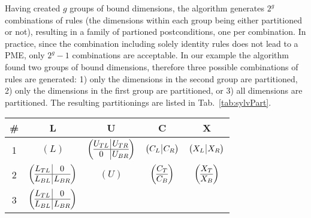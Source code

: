 \documentclass{llncs}
\begin{document}
Having created $g$ groups of bound dimensions, 
the algorithm generates $2^g$ combinations of rules
(the dimensions within each group being either partitioned or not), 
resulting in a family of partioned postconditions, one per combination.
In practice, since the combination including solely identity rules
does not lead to a PME, only $2^g-1$ combinations are acceptable.
In our example the algorithm found two groups of bound dimensions, 
therefore three possible combinations of rules are generated:
1) only the dimensions in the second group are partitioned, 
2) only the dimensions in the first group are partitioned, or
3) all dimensions are partitioned.
The resulting partitionings are listed in Tab.~\ref{tab:sylvPart}.

\begin{table}
\centering
\scriptsize
\renewcommand{\arraystretch}{1.4}
\begin{tabular}{c | c | c | c | c} \toprule
{\bf \#} & {\bf L}  & {\bf U} & {\bf C} & {\bf X} \\\midrule
\rowcolor[gray]{.9}
\scriptsize 1 \rule[-0.35cm]{0cm}{0.9cm} &
$(L)$ & 
$\left( \begin{array}{@{}c@{\,}|@{\,}c@{}} U_{TL} & U_{TR} \\\hline 0 & U_{BR} \end{array} \right)$ &
$\left( \begin{array}{@{}c@{\,}|@{\,}c@{}} C_{L} & C_{R} \end{array} \right)$ &
$\left( \begin{array}{@{}c@{\,}|@{\,}c@{}} X_{L} & X_{R} \end{array} \right)$ \\
\scriptsize 2 \rule[-0.35cm]{0cm}{0.9cm} &
$\left( \begin{array}{@{}c@{\,}|@{\,}c@{}} L_{TL} & 0 \\\hline L_{BL} & L_{BR} \end{array} \right)$ &
$(U)$ &
$\left( \begin{array}{@{}c@{}} C_{T} \\\hline C_{B} \end{array} \right)$ &
$\left( \begin{array}{@{}c@{}} X_{T} \\\hline X_{B} \end{array} \right)$ \\
\rowcolor[gray]{.9}
\scriptsize 3 \rule[-0.35cm]{0cm}{0.9cm} &
$\left( \begin{array}{@{}c@{\,}|@{\,}c@{}} L_{TL} & 0 \\\hline L_{BL} & L_{BR} \end{array} \right)$ &

\end{tabular}
\end{table}
\end{document}
